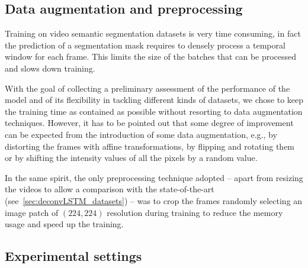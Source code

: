 \subsection{Data augmentation and preprocessing}
Training on video semantic segmentation datasets is very time consuming, in
fact the prediction of a segmentation mask requires to densely process a
temporal window for each frame. This limits the size of the batches that can
be processed and slows down training.

With the goal of collecting a preliminary assessment of the performance of the
model and of its flexibility in tackling different kinds of datasets, we chose
to keep the training time as contained as possible without resorting to data
augmentation techniques. However, it has to be pointed out that some degree of
improvement can be expected from the introduction of some data augmentation,
e.g., by distorting the frames with affine transformations, by flipping and
rotating them or by shifting the intensity values of all the pixels by a random
value.

In the same spirit, the only preprocessing technique adopted -- apart from
resizing the videos to allow a comparison with the state-of-the-art
(see~\autoref{sec:deconvLSTM_datasets}) -- was to crop the frames randomly
selecting an image patch of $(224, 224)$ resolution during training to reduce
the memory usage and speed up the training.

\subsection{Experimental settings}\label{sec:deconvLSTM_settings}

